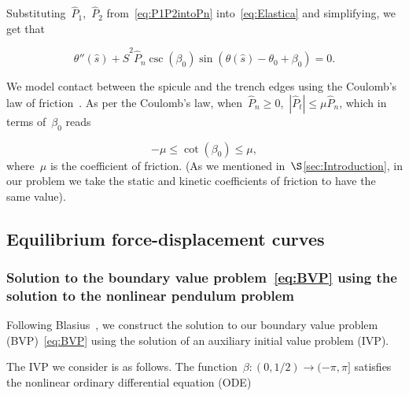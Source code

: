 \documentclass[preprint,10pt,times]{elsarticle}
\numberwithin{equation}{section}
\newcommand{\pr}[1]{\left( #1 \right)}
\begin{document}
Substituting~$\hat{P}_{1}$,~$\hat{P}_2$ from~\eqref{eq:P1P2intoPn}
into~\eqref{eq:Elastica} and simplifying, we get that

\begin{equation}
\label{eq:Elastica-Scaled}
\theta''(\hat{s})+\hat{S}^2\hat{P}_n\csc\pr{\beta_0}\sin(\theta(\hat{s})-\theta_{0}+\beta_{0})=0.
\end{equation}

We model contact between the spicule and the trench edges using the
Coulomb's law of friction~\cite{popov2017coulomb}. As per the Coulomb's
law, when~$\hat{P}_{n}\ge 0$,~$\left|\hat{P}_{t}\right|\le\mu\hat{P}_{n}$,
which in terms of~$\beta_0$ reads

\begin{equation}
-\mu\le\cot\pr{\beta_0}\le\mu,
\label{eq:CoulombLaw}
\end{equation}where~$\mu$ is the coefficient of friction. (As we
mentioned in~$\S$\ref{sec:Introduction}, in our problem we take
the static and kinetic coefficients of friction to have the same value).

\subsection{Equilibrium force-displacement curves\label{subsec:Equilibrium-force-displacement}}

\subsubsection{Solution to the boundary value problem~\eqref{eq:BVP} using the
solution to the nonlinear pendulum problem\label{subsec:Solution-to-the}}

Following Blasius~\cite[for accessible references, see, e.g.,][]{goldstein1938modern,klamkin1962transformation},
we construct the solution to our boundary value problem (BVP)~\eqref{eq:BVP}
using the solution of an auxiliary initial value problem (IVP).

The IVP we consider is as follows. The function~$\beta:(0,1/2)\to (-\pi,\pi]$
satisfies the nonlinear ordinary differential equation (ODE)
\end{document}
